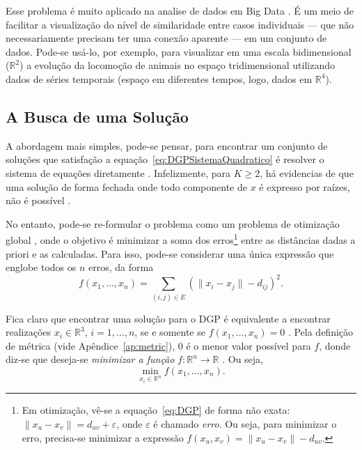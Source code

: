 \documentclass[a4paper,12pt]{article}
\begin{document}
Esse problema é muito aplicado na analise de dados em Big Data \cite{libertiEDG}. É um meio de facilitar a visualização do nível de similaridade entre casos individuais --- que não necessariamente precisam ter uma conexão aparente --- em um conjunto de dados. Pode-se usá-lo, por exemplo, para visualizar em uma escala bidimensional ($\mathbb{R}^2$) a evolução da locomoção de animais no espaço tridimensional utilizando dados de séries temporais (espaço em diferentes tempos, logo, dados em $\mathbb{R}^4$).

\subsection{A Busca de uma Solução}

A abordagem mais simples, pode-se pensar, para encontrar um conjunto de soluções que satisfação a equação~\ref{eq:DGPSistemaQuadratico} é resolver o sistema de equações diretamente \cite{carlileBook31Coloquio}. Infelizmente, para $K \geq 2$, há evidencias de que uma solução de forma fechada onde todo componente de $x$ é expresso por raízes, não é possível \cite{libertiEDG}. 

No entanto, pode-se re-formular o problema como um problema de otimização global \cite{libertiEDG}, onde o objetivo é minimizar a soma dos erros\footnote{Em otimização, vê-se a equação~\ref{eq:DGP} de forma não exata: $\lVert x_u - x_v \rVert = d_{uv} + \varepsilon$, onde $\varepsilon$ é chamado \textit{erro}. Ou seja, para minimizar o erro, precisa-se minimizar a expressão $f(x_u,x_v) = \lVert x_u - x_v \rVert - d_{uv}$.} entre as distâncias dadas a priori e as calculadas. Para isso, pode-se considerar uma única expressão que englobe todos os $n$ erros, da forma
\begin{equation}
	f(x_1,\dots,x_n) = \sum_{(i,j)\in E} \left(\lVert x_i - x_j \rVert - d_{ij}\right)^2.
\end{equation}

Fica claro que encontrar uma solução para o DGP é equivalente a encontrar realizações $x_i \in \mathbb{R}^3$, $i=1,\dots,n$, se e somente se $f(x_1,\dots,x_n) = 0$ \cite{libertiEDG}. Pela definição de métrica (vide Apêndice~\ref{ap:metric}), 0 é o menor valor possível para $f$, donde diz-se que deseja-se \textit{minimizar a função} $f: \mathbb{R}^n \longrightarrow \mathbb{R}$ \cite{carlileBook31Coloquio}. Ou seja,
\begin{equation}
	\min_{x_i \in \mathbb{R}^n} f(x_1,\dots,x_n).
\end{equation}
\end{document}
